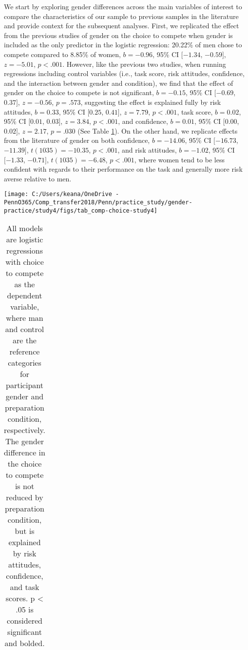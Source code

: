 \documentclass[letterpaper, nobind]{templates/ociamthesis}
\begin{document}
We start by exploring gender differences across the main variables of interest to compare the characteristics of our sample to previous samples in the literature and provide context for the subsequent analyses. First, we replicated the effect from the previous studies of gender on the choice to compete when gender is included as the only predictor in the logistic regression: 20.22\% of men chose to compete compared to 8.85\% of women, \(b = -0.96\), 95\% CI \([-1.34\), \(-0.59]\), \(z = -5.01\), \(p < .001\). However, like the previous two studies, when running regressions including control variables (i.e., task score, risk attitudes, confidence, and the interaction between gender and condition), we find that the effect of gender on the choice to compete is not significant, \(b = -0.15\), 95\% CI \([-0.69\), \(0.37]\), \(z = -0.56\), \(p = .573\), suggesting the effect is explained fully by risk attitudes, \(b = 0.33\), 95\% CI \([0.25\), \(0.41]\), \(z = 7.79\), \(p < .001\), task score, \(b = 0.02\), 95\% CI \([0.01\), \(0.03]\), \(z = 3.84\), \(p < .001\), and confidence, \(b = 0.01\), 95\% CI \([0.00\), \(0.02]\), \(z = 2.17\), \(p = .030\) (See Table \ref{tab:tab-comp-choice-study4}). On the other hand, we replicate effects from the literature of gender on both confidence, \(b = -14.06\), 95\% CI \([-16.73\), \(-11.39]\), \(t(1035) = -10.35\), \(p < .001\), and risk attitudes, \(b = -1.02\), 95\% CI \([-1.33\), \(-0.71]\), \(t(1035) = -6.48\), \(p < .001\), where women tend to be less confident with regards to their performance on the task and generally more risk averse relative to men.

\begin{center}\texttt{[image: C:/Users/keana/OneDrive - PennO365/Comp\_transfer2018/Penn/practice\_study/gender-practice/study4/figs/tab\_comp-choice-study4]} \end{center}

\begin{table}[ht]
\centering
\begingroup\fontsize{0.1pt}{0.1pt}\selectfont
\begin{tabular}{r}
   \\ 
 \end{tabular}
\endgroup
\caption{All models are logistic regressions with choice to compete as the dependent variable, where man and control are the reference categories for participant gender and preparation condition, respectively. The gender difference in the choice to compete is not reduced by preparation condition, but is explained by risk attitudes, confidence, and task scores. p < .05 is considered significant and bolded.} 
\label{tab:tab-comp-choice-study4}
\end{table}
\end{document}
